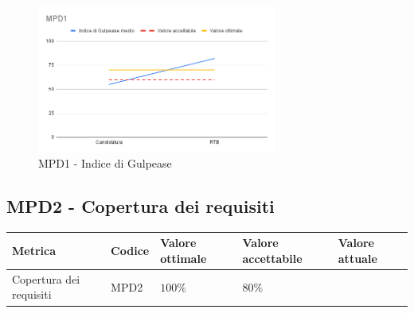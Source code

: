 \begin{figure}[htbp]
    \centering
    \includegraphics[width=0.7\textwidth]{img/MPD1.png}
    \caption{MPD1 - Indice di Gulpease}
    \label{fig:mpd1}
\end{figure}



\subsection{MPD2 - Copertura dei requisiti}
\label{s:mpc11}
\begin{table}[H]
    \centering
    \begin{tabularx}{\textwidth}{p{5.5cm}|X|l|l|l}
        \hline
		\textbf{Metrica} & \textbf{Codice} & \textbf{Valore ottimale} & \textbf{Valore accettabile}  & \textbf{Valore attuale} \\
        \hline
        Copertura dei requisiti & MPD2 &  $100\%$ & $80\%$  &   \\
    \end{tabularx}
\end{table}
